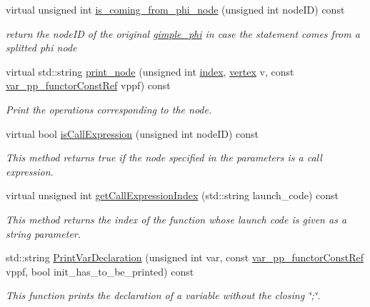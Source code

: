 \begin{DoxyCompactItemize}
virtual unsigned int \hyperlink{classBehavioralHelper_aa097a0720cb041bb7e647a70d849a3fa}{is\+\_\+coming\+\_\+from\+\_\+phi\+\_\+node} (unsigned int node\+ID) const
\begin{DoxyCompactList}\small\item\em return the node\+ID of the original \hyperlink{structgimple__phi}{gimple\+\_\+phi} in case the statement comes from a splitted phi node \end{DoxyCompactList}\item 
virtual std\+::string \hyperlink{classBehavioralHelper_a63abf8a92b3fe000ca65a322df34bbd4}{print\+\_\+node} (unsigned int \hyperlink{tutorial__pact__2019_2Introduction_2third_2include_2Keccak_8h_a028c9bdc8344cca38ab522a337074797}{index}, \hyperlink{graph_8hpp_abefdcf0544e601805af44eca032cca14}{vertex} v, const \hyperlink{var__pp__functor_8hpp_a8a6b51b6519401d911398943510557f0}{var\+\_\+pp\+\_\+functor\+Const\+Ref} vppf) const
\begin{DoxyCompactList}\small\item\em Print the operations corresponding to the node. \end{DoxyCompactList}\item 
virtual bool \hyperlink{classBehavioralHelper_a486a12168fcbe079b7963cb5053e089e}{is\+Call\+Expression} (unsigned int node\+ID) const
\begin{DoxyCompactList}\small\item\em This method returns true if the node specified in the parameters is a call expression. \end{DoxyCompactList}\item 
virtual unsigned int \hyperlink{classBehavioralHelper_a17cc11d87181726827e9dcd5682daf96}{get\+Call\+Expression\+Index} (std\+::string launch\+\_\+code) const
\begin{DoxyCompactList}\small\item\em This method returns the index of the function whose launch code is given as a string parameter. \end{DoxyCompactList}\item 
std\+::string \hyperlink{classBehavioralHelper_a615ea10adbdd1adaefb26e4f622c0ec7}{Print\+Var\+Declaration} (unsigned int var, const \hyperlink{var__pp__functor_8hpp_a8a6b51b6519401d911398943510557f0}{var\+\_\+pp\+\_\+functor\+Const\+Ref} vppf, bool init\+\_\+has\+\_\+to\+\_\+be\+\_\+printed) const
\begin{DoxyCompactList}\small\item\em This function prints the declaration of a variable without the closing \char`\"{};\char`\"{}. \end{DoxyCompactList}\item 

\end{DoxyCompactItemize}
